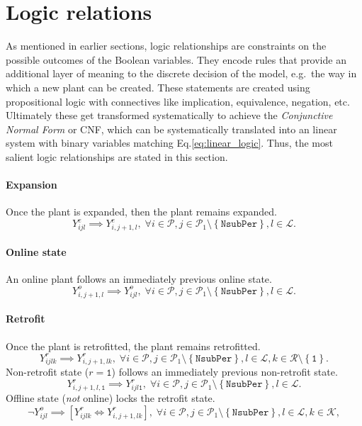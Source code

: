 \documentclass{amsart}
\begin{document}
\section{Logic relations}\label{sec:logic_relations}
%
As mentioned in earlier sections, logic relationships are constraints on the
possible outcomes of the Boolean variables. They encode rules
that provide an additional layer of meaning to the discrete decision of the
model, e.g.\ the way in which a new plant can be created. 
These statements are created using propositional logic with connectives like
implication, equivalence, negation, etc. Ultimately these get transformed
systematically to achieve the \emph{Conjunctive Normal Form} or CNF, which can
be systematically translated into an linear system with binary variables
matching Eq.\eqref{eq:linear_logic}.
%
Thus, the most salient logic relationships are stated in this section. 
%
\paragraph{Expansion}
%
Once the plant is expanded, then the plant remains expanded.
%
\begin{equation}
    Y^e_{ijl} \implies Y^e_{i, j+1, l}, \; \forall 
    i \in \mathcal{P},
    j \in \mathcal{P}_1 \setminus \left\{\mathtt{NsubPer}\right\},
    l\in \mathcal{L}.
\end{equation}
%
\paragraph{Online state}
An online plant follows an immediately previous online state.
%
\begin{equation}
    Y^o_{i,j+1,l} \implies Y^o_{ijl}, \; \forall 
    i \in \mathcal{P},
    j \in \mathcal{P}_1 \setminus \left\{\mathtt{NsubPer}\right\},
    l\in \mathcal{L}.
\end{equation}
%
\paragraph{Retrofit}
%
Once the plant is retrofitted, the plant remains retrofitted.
%
\begin{equation}
    Y^r_{ijlk} \implies Y^r_{i, j+1, lk}, \; \forall 
    i \in \mathcal{P},
    j \in \mathcal{P}_1 \setminus \left\{\mathtt{NsubPer}\right\},
    l\in \mathcal{L},
    k\in \mathcal{R} \setminus \left\{\mathtt{1}\right\}.
\end{equation}
%
Non-retrofit state ($r=\mathtt{1}$) follows an immediately previous non-retrofit
state.
%
\begin{equation}
    Y^r_{i, j+1, l,\mathtt{1}} \implies Y^r_{ijl\mathtt{1}} , \; \forall 
    i \in \mathcal{P},
    j \in \mathcal{P}_1 \setminus \left\{\mathtt{NsubPer}\right\},
    l\in \mathcal{L}.
\end{equation}
%
Offline state (\emph{not} online) locks the retrofit state.
%
\begin{equation}
    \neg Y^o_{ijl} \implies \left[Y^r_{ijlk} \iff Y^r_{i,j+1,lk}\right]
    , \; \forall
    i \in \mathcal{P},
    j \in \mathcal{P}_1 \setminus \left\{\mathtt{NsubPer}\right\},
    l \in \mathcal{L},
    k \in \mathcal{K},
\end{equation}
%
\end{document}
